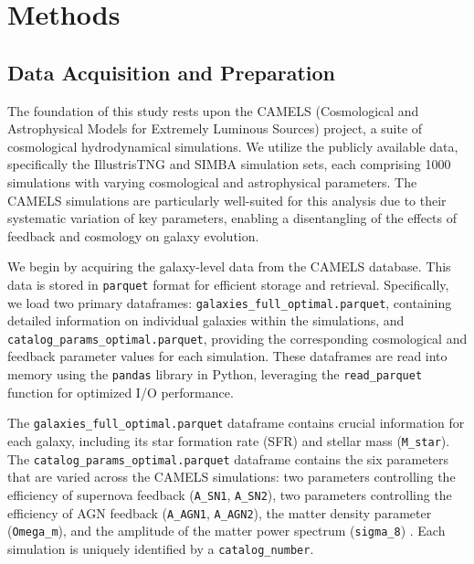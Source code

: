 \documentclass[twocolumn]{aastex631}
\begin{document}
\section{Methods}
\label{sec:methods}
\subsection{Data Acquisition and Preparation}
The foundation of this study rests upon the CAMELS (Cosmological and Astrophysical Models for Extremely Luminous Sources) project, a suite of cosmological hydrodynamical simulations. We utilize the publicly available data, specifically the IllustrisTNG and SIMBA simulation sets, each comprising 1000 simulations with varying cosmological and astrophysical parameters. The CAMELS simulations are particularly well-suited for this analysis due to their systematic variation of key parameters, enabling a disentangling of the effects of feedback and cosmology on galaxy evolution.

We begin by acquiring the galaxy-level data from the CAMELS database. This data is stored in \texttt{parquet} format for efficient storage and retrieval. Specifically, we load two primary dataframes: \texttt{galaxies\_full\_optimal.parquet}, containing detailed information on individual galaxies within the simulations, and \texttt{catalog\_params\_optimal.parquet}, providing the corresponding cosmological and feedback parameter values for each simulation. These dataframes are read into memory using the \texttt{pandas} library in Python, leveraging the \texttt{read\_parquet} function for optimized I/O performance.

The \texttt{galaxies\_full\_optimal.parquet} dataframe contains crucial information for each galaxy, including its star formation rate (SFR) and stellar mass (\texttt{M\_star}). The \texttt{catalog\_params\_optimal.parquet} dataframe contains the six parameters that are varied across the CAMELS simulations: two parameters controlling the efficiency of supernova feedback (\texttt{A\_SN1}, \texttt{A\_SN2}), two parameters controlling the efficiency of AGN feedback (\texttt{A\_AGN1}, \texttt{A\_AGN2}), the matter density parameter (\texttt{Omega\_m}), and the amplitude of the matter power spectrum (\texttt{sigma\_8}) \citep{villaescusanavarro2022camelsprojectpublicdata,lee2024zoomingcarpoolgplanenew}. Each simulation is uniquely identified by a \texttt{catalog\_number}.
\end{document}
